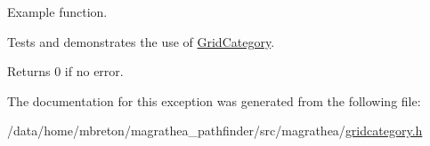 Example function. 

Tests and demonstrates the use of \hyperlink{exceptionmagrathea_1_1GridCategory}{Grid\-Category}. \begin{DoxyReturn}{Returns}
0 if no error. 
\end{DoxyReturn}


The documentation for this exception was generated from the following file\-:\begin{DoxyCompactItemize}
\item 
/data/home/mbreton/magrathea\-\_\-pathfinder/src/magrathea/\hyperlink{gridcategory_8h}{gridcategory.\-h}\end{DoxyCompactItemize}
